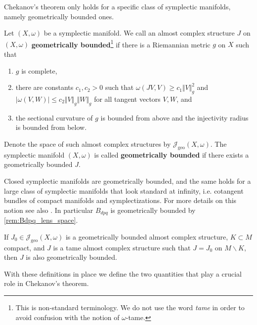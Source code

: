 \documentclass[12pt,a4paper,draft]{scrartcl}
\begin{document}
Chekanov's theorem only holds for a specific class of symplectic manifolds, namely geometrically bounded ones.

\begin{definition}
    \label{def:geobdd}
    Let $(X,\omega)$ be a symplectic manifold. We call an almost complex structure $J$ on $(X,\omega)$ \textbf{geometrically bounded}\footnote{This is non-standard terminology. We do not use the word \textit{tame} in order to avoid confusion with the notion of $\omega$-tame.} if there is a Riemannian metric $g$ on $X$ such that 
    \begin{enumerate}
        \item $g$ is complete,
        \item there are constants $c_1,c_2 > 0$ such that $\omega(JV,V) \geqslant c_1 \Vert V \Vert_g^2$ and $\vert \omega(V,W) \vert \leqslant c_2 \Vert V \Vert_g \Vert W \Vert_g$ for all tangent vectors $V,W$, and
        \item the sectional curvature of $g$ is bounded from above and the injectivity radius is bounded from below.
    \end{enumerate}
    Denote the space of such almost complex structures by $\mathcal{J}_{\text{geo}}(X,\omega)$.
    The symplectic manifold $(X,\omega)$ is called \textbf{geometrically bounded} if there exists a geometrically bounded $J$. 
\end{definition}

\begin{remark}
  \label{rem:Bdpq_geometrically_bounded}
    Closed symplectic manifolds are geometrically bounded, and the same holds for a large class of symplectic manifolds that look standard at infinity, i.e. cotangent bundles of compact manifolds and symplectizations. For more details on this notion see also \cite[Chapter X, Definition 2.2.1]{AudLaf94}. In particular $B_{dpq}$ is geometrically bounded by \cref{rem:Bdpq_lens_space}.
\end{remark}
\begin{remark}
  \label{rem:J_compactly_perturbed}
  If $J_0 \in \mathcal{J}_\text{geo}(X,ω)$ is a geometrically bounded almost complex structure, $K ⊂ M$ compact, and $J$ is a tame almost complex structure such that $J = J_0$ on $M ∖ K$, then $J$ is also geometrically bounded.
\end{remark}

With these definitions in place we define the two quantities that play a crucial role in Chekanov's theorem.
\end{document}
